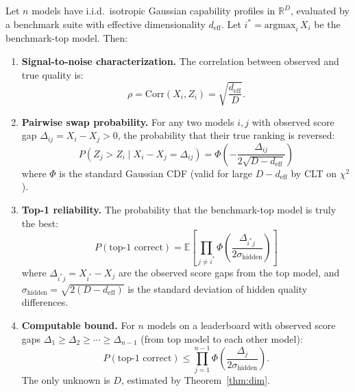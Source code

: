 \begin{theorem}
\label{thm:ranking}
Let $n$ models have i.i.d.\ isotropic Gaussian capability profiles in $\mathbb{R}^D$, evaluated by a benchmark suite with effective dimensionality $d_{\mathrm{eff}}$. Let $i^* = \mathrm{argmax}_i\, X_i$ be the benchmark-top model. Then:

\begin{enumerate}[label=(\alph*)]
  \item \textbf{Signal-to-noise characterization.} The correlation between observed and true quality is:
  \[
    \rho = \mathrm{Corr}(X_i, Z_i) = \sqrt{\frac{d_{\mathrm{eff}}}{D}}.
  \]

  \item \textbf{Pairwise swap probability.} For any two models $i, j$ with observed score gap $\Delta_{ij} = X_i - X_j > 0$, the probability that their true ranking is reversed:
  \[
    P(Z_j > Z_i \mid X_i - X_j = \Delta_{ij}) = \Phi\!\left(-\frac{\Delta_{ij}}{2\sqrt{D - d_{\mathrm{eff}}}}\right)
  \]
  where $\Phi$ is the standard Gaussian CDF (valid for large $D - d_{\mathrm{eff}}$ by CLT on $\chi^2$).

  \item \textbf{Top-1 reliability.} The probability that the benchmark-top model is truly the best:
  \[
    P(\text{top-1 correct}) = \mathbb{E}\!\left[\prod_{j \neq i^*} \Phi\!\left(\frac{\Delta_{i^* j}}{2\sigma_{\mathrm{hidden}}}\right)\right]
  \]
  where $\Delta_{i^* j} = X_{i^*} - X_j$ are the observed score gaps from the top model, and $\sigma_{\mathrm{hidden}} = \sqrt{2(D - d_{\mathrm{eff}})}$ is the standard deviation of hidden quality differences.

  \item \textbf{Computable bound.} For $n$ models on a leaderboard with observed score gaps $\Delta_1 \geq \Delta_2 \geq \cdots \geq \Delta_{n-1}$ (from top model to each other model):
  \[
    P(\text{top-1 correct}) \leq \prod_{j=1}^{n-1} \Phi\!\left(\frac{\Delta_j}{2\sigma_{\mathrm{hidden}}}\right).
  \]
  The only unknown is $D$, estimated by Theorem~\ref{thm:dim}.
\end{enumerate}
\end{theorem}

